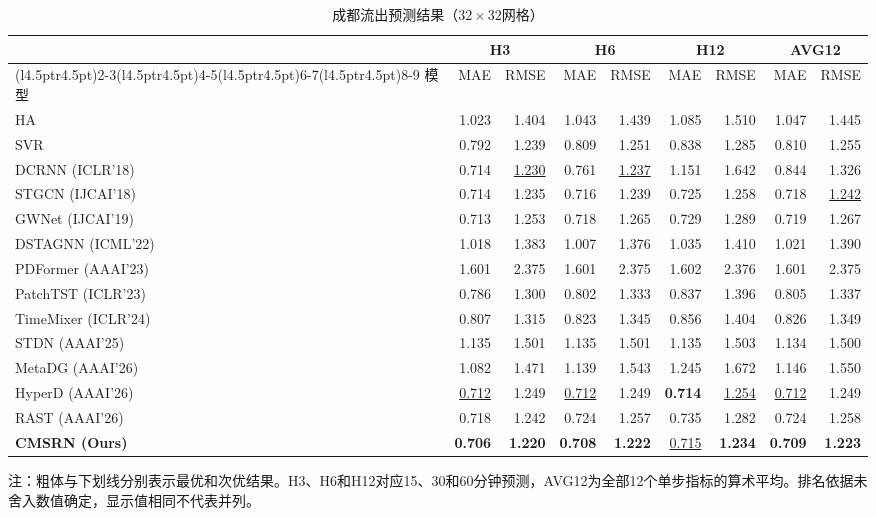 \begin{table}[!htbp]
\centering
\caption{成都流出预测结果（\(32\times32\)网格）}
\label{tab:chengdu-outflow}
\begingroup
\linespread{1}\fontsize{10}{12}\selectfont
\setlength{\tabcolsep}{4.5pt}
\renewcommand{\arraystretch}{1.05}
\begin{tabular*}{\linewidth}{@{\extracolsep{\fill}}l*{8}{r}@{}}
\toprule
& \multicolumn{2}{c}{H3} & \multicolumn{2}{c}{H6} & \multicolumn{2}{c}{H12} & \multicolumn{2}{c}{AVG12} \\
\cmidrule(l{4.5pt}r{4.5pt}){2-3}\cmidrule(l{4.5pt}r{4.5pt}){4-5}\cmidrule(l{4.5pt}r{4.5pt}){6-7}\cmidrule(l{4.5pt}r{4.5pt}){8-9}
模型 & MAE & RMSE & MAE & RMSE & MAE & RMSE & MAE & RMSE \\
\midrule
HA & 1.023 & 1.404 & 1.043 & 1.439 & 1.085 & 1.510 & 1.047 & 1.445 \\
SVR & 0.792 & 1.239 & 0.809 & 1.251 & 0.838 & 1.285 & 0.810 & 1.255 \\
DCRNN (ICLR'18) & 0.714 & \underline{1.230} & 0.761 & \underline{1.237} & 1.151 & 1.642 & 0.844 & 1.326 \\
STGCN (IJCAI'18) & 0.714 & 1.235 & 0.716 & 1.239 & 0.725 & 1.258 & 0.718 & \underline{1.242} \\
GWNet (IJCAI'19) & 0.713 & 1.253 & 0.718 & 1.265 & 0.729 & 1.289 & 0.719 & 1.267 \\
DSTAGNN (ICML'22) & 1.018 & 1.383 & 1.007 & 1.376 & 1.035 & 1.410 & 1.021 & 1.390 \\
PDFormer (AAAI'23) & 1.601 & 2.375 & 1.601 & 2.375 & 1.602 & 2.376 & 1.601 & 2.375 \\
PatchTST (ICLR'23) & 0.786 & 1.300 & 0.802 & 1.333 & 0.837 & 1.396 & 0.805 & 1.337 \\
TimeMixer (ICLR'24) & 0.807 & 1.315 & 0.823 & 1.345 & 0.856 & 1.404 & 0.826 & 1.349 \\
STDN (AAAI'25) & 1.135 & 1.501 & 1.135 & 1.501 & 1.135 & 1.503 & 1.134 & 1.500 \\
MetaDG (AAAI'26) & 1.082 & 1.471 & 1.139 & 1.543 & 1.245 & 1.672 & 1.146 & 1.550 \\
HyperD (AAAI'26) & \underline{0.712} & 1.249 & \underline{0.712} & 1.249 & \textbf{0.714} & \underline{1.254} & \underline{0.712} & 1.249 \\
RAST (AAAI'26) & 0.718 & 1.242 & 0.724 & 1.257 & 0.735 & 1.282 & 0.724 & 1.258 \\
\midrule
\textbf{CMSRN (Ours)} & \textbf{0.706} & \textbf{1.220} & \textbf{0.708} & \textbf{1.222} & \underline{0.715} & \textbf{1.234} & \textbf{0.709} & \textbf{1.223} \\
\bottomrule
\end{tabular*}
\endgroup
\par\smallskip
\begin{minipage}{\linewidth}
\footnotesize\linespread{1.1}\selectfont\raggedright
注：粗体与下划线分别表示最优和次优结果。H3、H6和H12对应15、30和60分钟预测，AVG12为全部12个单步指标的算术平均。排名依据未舍入数值确定，显示值相同不代表并列。
\end{minipage}
\end{table}

